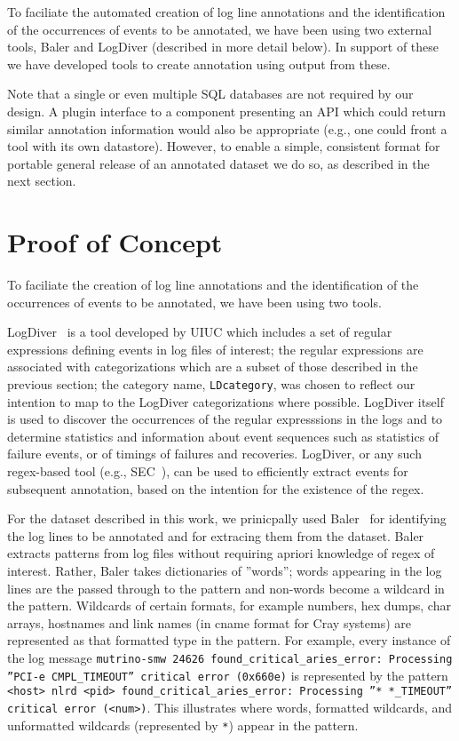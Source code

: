 To faciliate the automated creation of log line annotations
and the identification of the occurrences of events to be annotated,
we have been using two external tools, Baler and LogDiver (described in more detail below).
In support of these we have developed tools to create annotation using output from these.

Note that a single or even multiple SQL databases are not required by our design. A plugin interface to a component presenting an API which could return similar annotation information would also be appropriate (e.g., one could front a tool with its own datastore). However, to enable a simple, consistent format for portable general release of an annotated dataset we do so, as described in the next section.

\section{Proof of Concept}
\label{s:proof}
To faciliate the creation of log line annotations
and the identification of the occurrences of events to be annotated,
we have been using two tools.

LogDiver~\cite{LogDiver} is a tool developed by UIUC which includes a set of regular expressions defining
events in log files of interest; the regular expressions are associated with categorizations
which are a subset of those described in the previous section; the
category name, \texttt{LDcategory}, was chosen to reflect our intention to map to the
LogDiver categorizations where possible.
LogDiver itself is used to discover the occurrences of the regular
expresssions in the logs and to determine statistics and information about event sequences
such as statistics of failure events, or of timings of failures and recoveries.
LogDiver, or any such regex-based tool (e.g., SEC~\cite{SEC}), can be used to efficiently extract events
for subsequent annotation, based on the intention for the existence of the regex.

For the dataset described in this work, we prinicpally used Baler~\cite{Baler} for
identifying the log lines to be annotated and for extracing them from the dataset.
Baler extracts patterns from log files without requiring apriori knowledge of
regex of interest. Rather, Baler takes dictionaries of ''words''; words appearing in the log lines
are the passed through to the pattern and non-words become a wildcard in the pattern.
Wildcards of certain formats, for example numbers, hex dumps, char arrays, hostnames and link names
(in cname format for Cray systems) are represented as that formatted type in the pattern.
For example, every instance of the log message \texttt{mutrino-smw 24626 found\_critical\_aries\_error: Processing ''PCI-e CMPL\_TIMEOUT'' critical error (0x660e)}
is represented by the pattern \texttt{<host> nlrd <pid> found\_critical\_aries\_error: Processing ''* *\_TIMEOUT'' critical error (<num>)}.
This illustrates where words, formatted wildcards, and unformatted wildcards (represented by \texttt{*}) appear in the pattern.

